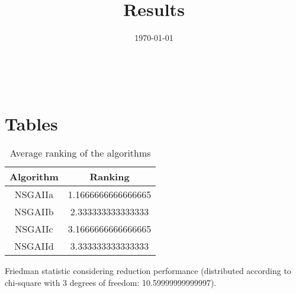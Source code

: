\documentclass{article}
\title{Results}
\author{}
\date{\today}
\begin{document}
\oddsidemargin 0in \topmargin 0in\maketitle
\
\section{Tables}
\begin{table}[!htp]
\centering
\caption{Average ranking of the algorithms}
\begin{tabular}{c|c}
Algorithm&Ranking\\
\hline
NSGAIIa&1.1666666666666665\\
NSGAIIb&2.333333333333333\\
NSGAIIc&3.1666666666666665\\
NSGAIId&3.333333333333333\\
\end{tabular}
\end{table}


Friedman statistic considering reduction performance (distributed according to chi-square with 3 degrees of freedom: 10.59999999999997).
\end{document}
